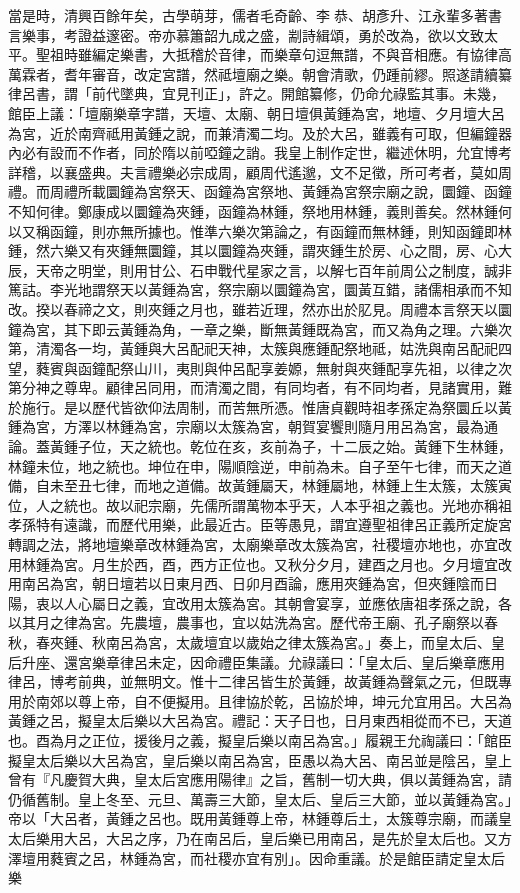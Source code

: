\begin{pinyinscope}
當是時，清興百餘年矣，古學萌芽，儒者毛奇齡、李恭、胡彥升、江永輩多著書言樂事，考證益邃密。帝亦慕簫韶九成之盛，剬詩緝頌，勇於改為，欲以文致太平。聖祖時雖編定樂書，大抵稽於音律，而樂章句逗無譜，不與音相應。有協律高萬霖者，耆年審音，改定宮譜，然祗壇廟之樂。朝會清歌，仍踵前繆。照遂請續纂律呂書，謂「前代墜典，宜見刊正」，許之。開館纂修，仍命允祿監其事。未幾，館臣上議：「壇廟樂章字譜，天壇、太廟、朝日壇俱黃鍾為宮，地壇、夕月壇大呂為宮，近於南齊祗用黃鍾之說，而兼清濁二均。及於大呂，雖義有可取，但編鐘器內必有設而不作者，同於隋以前啞鐘之誚。我皇上制作定世，繼述休明，允宜博考詳稽，以襄盛典。夫言禮樂必宗成周，顧周代遙邈，文不足徵，所可考者，莫如周禮。而周禮所載圜鐘為宮祭天、函鐘為宮祭地、黃鍾為宮祭宗廟之說，圜鐘、函鐘不知何律。鄭康成以圜鐘為夾鍾，函鐘為林鍾，祭地用林鍾，義則善矣。然林鍾何以又稱函鐘，則亦無所據也。惟準六樂次第論之，有函鐘而無林鍾，則知函鐘即林鍾，然六樂又有夾鍾無圜鐘，其以圜鐘為夾鍾，謂夾鍾生於房、心之間，房、心大辰，天帝之明堂，則用甘公、石申戰代星家之言，以解七百年前周公之制度，誠非篤詁。李光地謂祭天以黃鍾為宮，祭宗廟以圜鐘為宮，圜黃互錯，諸儒相承而不知改。揆以春禘之文，則夾鍾之月也，雖若近理，然亦出於肊見。周禮本言祭天以圜鐘為宮，其下即云黃鍾為角，一章之樂，斷無黃鍾既為宮，而又為角之理。六樂次第，清濁各一均，黃鍾與大呂配祀天神，太簇與應鍾配祭地祗，姑洗與南呂配祀四望，蕤賓與函鐘配祭山川，夷則與仲呂配享姜嫄，無射與夾鍾配享先祖，以律之次第分神之尊卑。顧律呂同用，而清濁之間，有同均者，有不同均者，見諸實用，難於施行。是以歷代皆欲仰法周制，而苦無所憑。惟唐貞觀時祖孝孫定為祭圜丘以黃鍾為宮，方澤以林鍾為宮，宗廟以太簇為宮，朝賀宴饗則隨月用呂為宮，最為通論。蓋黃鍾子位，天之統也。乾位在亥，亥前為子，十二辰之始。黃鍾下生林鍾，林鐘未位，地之統也。坤位在申，陽順陰逆，申前為未。自子至午七律，而天之道備，自未至丑七律，而地之道備。故黃鍾屬天，林鍾屬地，林鍾上生太簇，太簇寅位，人之統也。故以祀宗廟，先儒所謂萬物本乎天，人本乎祖之義也。光地亦稱祖孝孫特有遠識，而歷代用樂，此最近古。臣等愚見，謂宜遵聖祖律呂正義所定旋宮轉調之法，將地壇樂章改林鍾為宮，太廟樂章改太簇為宮，社稷壇亦地也，亦宜改用林鍾為宮。月生於西，酉，西方正位也。又秋分夕月，建酉之月也。夕月壇宜改用南呂為宮，朝日壇若以日東月西、日卯月酉論，應用夾鍾為宮，但夾鍾陰而日陽，衷以人心屬日之義，宜改用太簇為宮。其朝會宴享，並應依唐祖孝孫之說，各以其月之律為宮。先農壇，農事也，宜以姑洗為宮。歷代帝王廟、孔子廟祭以春秋，春夾鍾、秋南呂為宮，太歲壇宜以歲始之律太簇為宮。」奏上，而皇太后、皇后升座、還宮樂章律呂未定，因命禮臣集議。允祿議曰：「皇太后、皇后樂章應用律呂，博考前典，並無明文。惟十二律呂皆生於黃鍾，故黃鍾為聲氣之元，但既專用於南郊以尊上帝，自不便擬用。且律協於乾，呂協於坤，坤元允宜用呂。大呂為黃鍾之呂，擬皇太后樂以大呂為宮。禮記：天子日也，日月東西相從而不已，天道也。酉為月之正位，援後月之義，擬皇后樂以南呂為宮。」履親王允祹議曰：「館臣擬皇太后樂以大呂為宮，皇后樂以南呂為宮，臣愚以為大呂、南呂並是陰呂，皇上曾有『凡慶賀大典，皇太后宮應用陽律』之旨，舊制一切大典，俱以黃鍾為宮，請仍循舊制。皇上冬至、元旦、萬壽三大節，皇太后、皇后三大節，並以黃鍾為宮。」帝以「大呂者，黃鍾之呂也。既用黃鍾尊上帝，林鍾尊后土，太簇尊宗廟，而議皇太后樂用大呂，大呂之序，乃在南呂后，皇后樂已用南呂，是先於皇太后也。又方澤壇用蕤賓之呂，林鍾為宮，而社稷亦宜有別」。因命重議。於是館臣請定皇太后樂
\end{pinyinscope}
